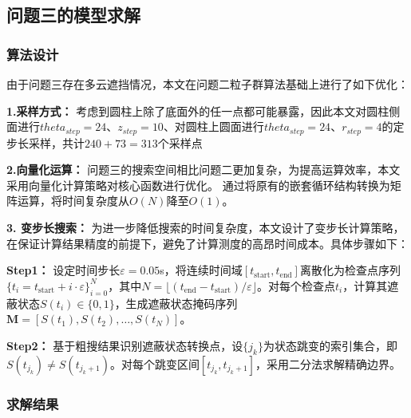 \documentclass[withoutpreface,bwprint]{cumcmthesis}
\numberwithin{equation}{section} %
\numberwithin{figure}{section} %
\numberwithin{table}{section}  %
\begin{document}

\vspace{-0.5em}
\subsection{问题三的模型求解}
\vspace{-0.5em}
\subsubsection{算法设计}
由于问题三存在多云遮挡情况，本文在问题二粒子群算法基础上进行了如下优化：

\textbf{1.采样方式：}
考虑到圆柱上除了底面外的任一点都可能暴露，因此本文对圆柱侧面进行$theta_{step}=24$、$z_{step}=10$、对圆柱上圆面进行$theta_{step}=24$、$r_{step}=4$的定步长采样，共计$240+73=313$个采样点

\textbf{2.向量化运算：}
问题三的搜索空间相比问题二更加复杂，为提高运算效率，本文采用向量化计算策略对核心函数进行优化。
通过将原有的嵌套循环结构转换为矩阵运算，将时间复杂度从$O(N)$降至$O(1)$。

\textbf{3. 变步长搜索：}
为进一步降低搜索的时间复杂度，本文设计了变步长计算策略，在保证计算结果精度的前提下，避免了计算测度的高昂时间成本。具体步骤如下：

\textbf{Step1：} 设定时间步长$\varepsilon = 0.05$s，将连续时间域$[t_{\text{start}}, t_{\text{end}}]$离散化为检查点序列$\{t_i = t_{\text{start}} + i \cdot \varepsilon\}_{i=0}^{N}$，其中$N = \lfloor(t_{\text{end}} - t_{\text{start}})/\varepsilon\rfloor$。对每个检查点$t_i$，计算其遮蔽状态$S(t_i) \in \{0,1\}$，生成遮蔽状态掩码序列$\mathbf{M} = [S(t_1), S(t_2), \ldots, S(t_N)]$。

\textbf{Step2：} 基于粗搜结果识别遮蔽状态转换点，设$\{j_k\}$为状态跳变的索引集合，即$S(t_{j_k}) \neq S(t_{j_k+1})$。对每个跳变区间$[t_{j_k}, t_{j_k+1}]$，采用二分法求解精确边界。

\vspace{-0.5em}
\subsubsection{求解结果}
\end{document}
